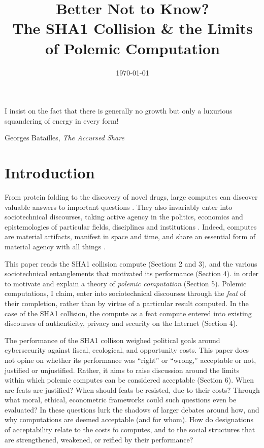 \documentclass[sigconf]{acmart}
\date{\today}
\title{Better Not to Know?\\\medskip
\large The SHA1 Collision \& the Limits of Polemic Computation}
\begin{document}
\maketitle

\epigraph{I insist on the fact that there is generally no growth but only a luxurious squandering of energy in every form!}{Georges Batailles, \textit{The Accursed Share}}


\section{Introduction}
\label{sec:org6098e89}

From protein folding to the discovery of novel drugs,
large computes can discover valuable answers to important questions
\cite{Anderson2004}.
They also invariably enter into sociotechnical discourses,
taking active agency in the politics, economics and epistemologies 
of particular fields, disciplines and institutions \cite{Ames2015}.
Indeed, computes are material artifacts, manifest in space and time,
and share an essential form of material agency with all things \cite{Bennett2013a,Winner2003}.

This paper reads the SHA1 collision compute (Sections 2 and 3), 
and the various sociotechnical entanglements that motivated its performance (Section 4).
in order to motivate and explain a theory of \emph{polemic computation} (Section 5).
Polemic computations, I claim, enter into sociotechnical discourses through the \emph{feat} of their completion, rather than by virtue of a particular result computed.
In the case of the SHA1 collision, the compute as a feat compute entered into existing discourses of authenticity, privacy and security on the Internet (Section 4).

The performance of the SHA1 collison weighed political goals around cybersecurity against fiscal, ecological, and opportunity costs.
This paper does not opine on whether its performance was ``right'' or ``wrong,'' acceptable or not, justified or unjustified.
Rather, it aims to raise discussion around the limits within which polemic computes can be considered acceptable (Section 6).
When are feats are justified? 
When should feats be resisted, due to their costs? 
Through what moral, ethical, econometric frameworks could such questions even be evaluated? 
In these questions lurk the shadows of larger debates around how, and why computations are deemed acceptable (and for whom).
How do designations of acceptability relate to the costs fo computes, and to the social structures that are strengthened, weakened, or reified by their performance?
\end{document}
